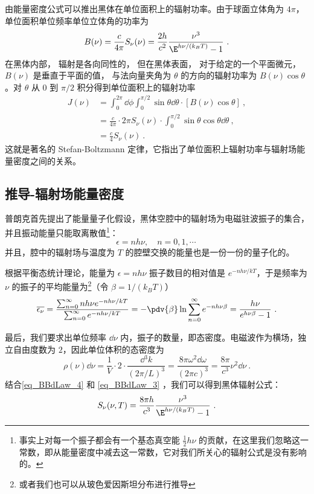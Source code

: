 由能量密度公式可以推出黑体在单位面积上的辐射功率。由于球面立体角为 $4\pi$，单位面积单位频率单位立体角的功率为
\begin{equation}\label{eq_BBdLaw_2}
B(\nu) = \frac{c}{4\pi}S_\nu(\nu) = \frac{2h}{c^2} \frac{\nu^3}{\E^{h\nu/(k_B T)} - 1}~.
\end{equation}
在黑体内部， 辐射是各向同性的， 但在黑体表面， 对于给定的一个平面微元， $B(\nu)$ 是垂直于平面的值， 与法向量夹角为 $\theta$ 的方向的辐射功率为 $B(\nu)\cos\theta$。对 $\theta$ 从 $0$ 到 $\pi/2$ 积分得到单位面积上的辐射功率
\begin{equation}
\begin{aligned}
J(\nu)&=\int_0^{2\pi} \dd\phi \int_0^{\pi/2} \sin\theta \dd \theta \cdot \left[B(\nu)\cos\theta\right] ~,\\
&=\frac{c}{4\pi}\cdot 2\pi S_\nu(\nu) \cdot \int_0^{\pi/2} \sin\theta\cos\theta \dd\theta ~,\\
&= \frac{c}{4} S_\nu(\nu) ~.
\end{aligned}
\end{equation}
这就是著名的 Stefan-Boltzmann 定律，它指出了单位面积上辐射功率与辐射场能量密度之间的关系。

\subsection{推导-辐射场能量密度}
普朗克首先提出了能量量子化假设，黑体空腔中的辐射场为电磁驻波振子的集合，并且振动能量只能取离散值\footnote{事实上对每一个振子都会有一个基态真空能 $\frac{1}{2}h\nu$ 的贡献，在这里我们忽略这一常数，即从能量密度中减去这一常数，它对我们所关心的辐射公式是没有影响的。}：
\begin{equation}
\epsilon = nh\nu, \quad n=0,1,\cdots~
\end{equation}
并且，腔中的辐射场与温度为 $T$ 的腔壁交换的能量也是一份一份的量子化的。

根据平衡态统计理论，能量为 $\epsilon=nh\nu$ 振子数目的相对值是 $e^{-nh\nu/kT}$，于是频率为 $\nu$ 的振子的平均能量为\footnote{或者我们也可以从玻色爱因斯坦分布进行推导}（令 $\beta = 1/(k_BT)$）
\begin{equation}\label{eq_BBdLaw_4}
\overline{\epsilon_\nu}=\frac{\sum_{n=0}^\infty nh\nu e^{-nh\nu/kT}}{\sum_{n=0}^\infty e^{-nh\nu/kT}}=-\pdv{\beta}\ln \sum_{n=0}^\infty e^{-nh\nu\beta}=\frac{h\nu}{e^{h\nu\beta}-1}~.
\end{equation}


最后，我们要求出单位频率 $\dd \nu$ 内，振子的数量，即态密度。电磁波作为横场，独立自由度数为 $2$，因此单位体积的态密度为
\begin{equation}\label{eq_BBdLaw_3}
\rho(\nu) \dd \nu= \frac{1}{V}\cdot 2\cdot \frac{\dd{} ^3 k}{(2\pi/L)^3}=\frac{8\pi \omega^2 \dd \omega}{(2\pi c)^3}= \frac{8\pi}{c^3}\nu^2\dd \nu~.
\end{equation}
结合\autoref{eq_BBdLaw_4} 和 \autoref{eq_BBdLaw_3} ，我们可以得到黑体辐射公式：
\begin{equation}
S_\nu(\nu,T) = \frac{8\pi h}{c^3}\frac{\nu^3}{\E^{h\nu/(k_B T)} - 1}~.
\end{equation}
